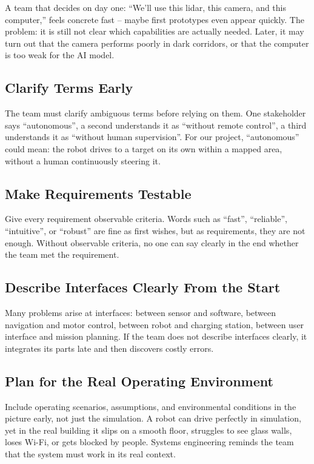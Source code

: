 A team that decides on day one: \enquote{We'll use this lidar, this camera, and this computer,} feels concrete fast -- maybe first prototypes even appear quickly. The problem: it is still not clear which capabilities are actually needed. Later, it may turn out that the camera performs poorly in dark corridors, or that the computer is too weak for the AI model.

\subsection{Clarify Terms Early}
The team must clarify ambiguous terms before relying on them. One stakeholder says \enquote{autonomous}, a second understands it as \enquote{without remote control}, a third understands it as \enquote{without human supervision}. For our project, \enquote{autonomous} could mean: the robot drives to a target on its own within a mapped area, without a human continuously steering it.

\subsection{Make Requirements Testable}
Give every requirement observable criteria. Words such as \enquote{fast}, \enquote{reliable}, \enquote{intuitive}, or \enquote{robust} are fine as first wishes, but as requirements, they are not enough. Without observable criteria, no one can say clearly in the end whether the team met the requirement.

\subsection{Describe Interfaces Clearly From the Start}
Many problems arise at interfaces: between sensor and software, between navigation and motor control, between robot and charging station, between user interface and mission planning. If the team does not describe interfaces clearly, it integrates its parts late and then discovers costly errors.

\subsection{Plan for the Real Operating Environment}
Include operating scenarios, assumptions, and environmental conditions in the picture early, not just the simulation. A robot can drive perfectly in simulation, yet in the real building it slips on a smooth floor, struggles to see glass walls, loses Wi-Fi, or gets blocked by people. Systems engineering reminds the team that the system must work in its real context.


